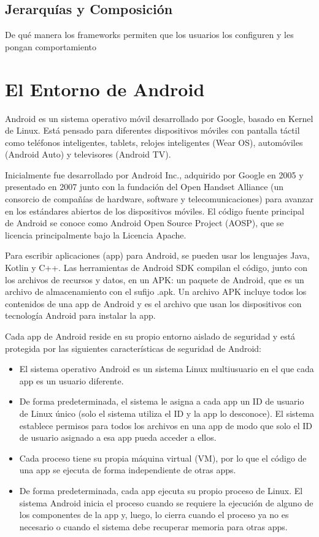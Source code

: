  \cite{johnson1988designing}

\subsection{Jerarquías y Composición}
De qué manera los frameworks permiten que los usuarios los configuren y les pongan comportamiento

\section{El Entorno de Android}

Android es un sistema operativo móvil desarrollado por Google, basado en Kernel de Linux. Está pensado para diferentes dispositivos móviles con pantalla táctil como teléfonos inteligentes, tablets, relojes inteligentes (Wear OS), automóviles (Android Auto) y televisores (Android TV).

Inicialmente fue desarrollado por Android Inc., adquirido por Google en 2005 y presentado en 2007 junto con la fundación del Open Handset Alliance (un consorcio de compañías de hardware, software y telecomunicaciones) para avanzar en los estándares abiertos de los dispositivos móviles. El código fuente principal de Android se conoce como Android Open Source Project (AOSP), que se licencia principalmente bajo la Licencia Apache. 

Para escribir aplicaciones (app) para Android, se pueden usar los lenguajes Java, Kotlin y C++. Las herramientas de Android SDK compilan el código, junto con los archivos de recursos y datos, en un APK: un paquete de Android, que es un archivo de almacenamiento con el sufijo .apk. Un archivo APK incluye todos los contenidos de una app de Android y es el archivo que usan los dispositivos con tecnología Android para instalar la app.

Cada app de Android reside en su propio entorno aislado de seguridad y está protegida por las siguientes características de seguridad de Android:
\begin{itemize}
	\item El sistema operativo Android es un sistema Linux multiusuario en el que cada app es un usuario diferente.
	\item De forma predeterminada, el sistema le asigna a cada app un ID de usuario de Linux único (solo el sistema utiliza el ID y la app lo desconoce). El sistema establece permisos para todos los archivos en una app de modo que solo el ID de usuario asignado a esa app pueda acceder a ellos.
	\item Cada proceso tiene su propia máquina virtual (VM), por lo que el código de una app se ejecuta de forma independiente de otras apps.
	\item De forma predeterminada, cada app ejecuta su propio proceso de Linux. El sistema Android inicia el proceso cuando se requiere la ejecución de alguno de los componentes de la app y, luego, lo cierra cuando el proceso ya no es necesario o cuando el sistema debe recuperar memoria para otras apps.
\end{itemize}

